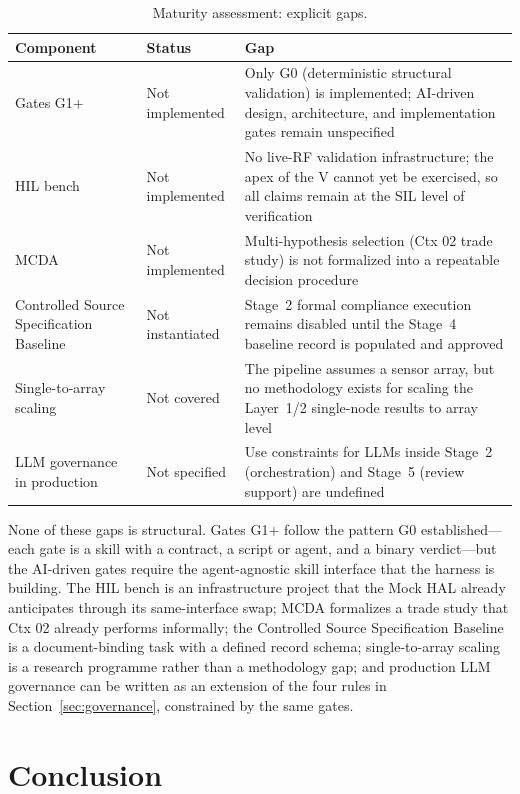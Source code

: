 \documentclass[11pt,a4paper]{article}
\begin{document}
\begin{table}[htbp]
\centering
\caption{Maturity assessment: explicit gaps.}
\label{tab:gaps}
\small
\begin{tabular}{@{}lp{3.1cm}p{7.2cm}@{}}
\toprule
\textbf{Component} & \textbf{Status} & \textbf{Gap} \\
\midrule
Gates G1+ & Not implemented & Only G0 (deterministic structural validation) is implemented; AI-driven design, architecture, and implementation gates remain unspecified \\
HIL bench & Not implemented & No live-RF validation infrastructure; the apex of the V cannot yet be exercised, so all claims remain at the SIL level of verification \\
MCDA \cite{mcda2026} & Not implemented & Multi-hypothesis selection (Ctx 02 trade study) is not formalized into a repeatable decision procedure \\
Controlled Source Specification Baseline & Not instantiated & Stage~2 formal compliance execution remains disabled until the Stage~4 baseline record is populated and approved \\
Single-to-array scaling & Not covered & The pipeline assumes a sensor array, but no methodology exists for scaling the Layer~1/2 single-node results to array level \\
LLM governance in production & Not specified & Use constraints for LLMs inside Stage~2 (orchestration) and Stage~5 (review support) are undefined \\
\bottomrule
\end{tabular}
\end{table}

None of these gaps is structural. Gates G1+ follow the pattern G0 established---each gate is
a skill with a contract, a script or agent, and a binary verdict---but the AI-driven gates
require the agent-agnostic skill interface that the harness is building. The HIL bench is an
infrastructure project that the Mock HAL already anticipates through its same-interface swap;
MCDA formalizes a trade study that Ctx 02 already performs informally; the Controlled Source
Specification Baseline is a document-binding task with a defined record schema; single-to-array
scaling is a research programme rather than a methodology gap; and production LLM governance
can be written as an extension of the four rules in Section~\ref{sec:governance}, constrained by the
same gates.

\section{Conclusion}
\label{sec:conclusion}
\end{document}
